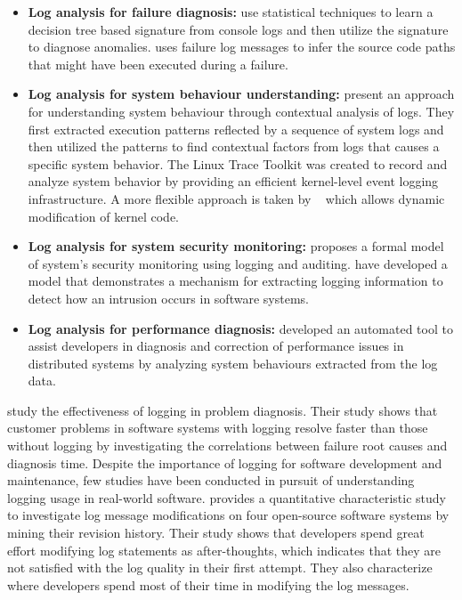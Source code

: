 \begin{itemize} [leftmargin=0.5in]
\item \textbf{Log analysis for failure diagnosis:} \citet{xu2009detecting} use statistical techniques to learn a decision tree based signature from console logs and then utilize the signature to diagnose anomalies.  \cite{yuan2010sherlog} uses failure log messages to infer the source code paths that might have been executed during a failure.
\item \textbf{Log analysis for system behaviour understanding:} \citet{fu2013contextual} present an approach for understanding system behaviour through contextual analysis of logs. They first extracted execution patterns reflected by a sequence of system logs and then utilized the patterns to find contextual factors from logs that causes a specific system behavior. The Linux Trace Toolkit \cite{yaghmour2000measuringandcharacter} was created to record and analyze system behavior by providing an efficient kernel-level event logging infrastructure. A more flexible approach is taken by ~\cite{cantrill2004dynamic} which allows dynamic modification of kernel code.
\item \textbf{Log analysis for system security monitoring:} \citet{bishop1989model} proposes a formal model of system's security monitoring using logging and auditing. \citet{peisert2007toward} have developed a model that demonstrates a mechanism for extracting logging information to detect how an intrusion occurs in software systems.
\item \textbf{Log analysis for performance diagnosis:} \citet{nagaraj2012structured} developed an automated tool to assist developers in diagnosis and correction of performance issues in distributed systems by analyzing system behaviours extracted from the log data.
\end{itemize}

\citet{jiang2009understanding} study the effectiveness of logging in problem diagnosis. Their study shows that customer problems in software systems with logging resolve faster than those without logging by investigating the correlations between failure root causes and diagnosis time. Despite the importance of logging for software development and maintenance, few studies have been conducted in pursuit of understanding logging usage in real-world software. \citet{yuan2012characterizing} provides a quantitative characteristic study to investigate log message modifications on four open-source software systems by mining their revision history. Their study shows that developers spend great effort modifying log statements as after-thoughts, which indicates that they are not satisfied with the log quality in their first attempt. They also characterize where developers spend most of their time in modifying the log messages.

